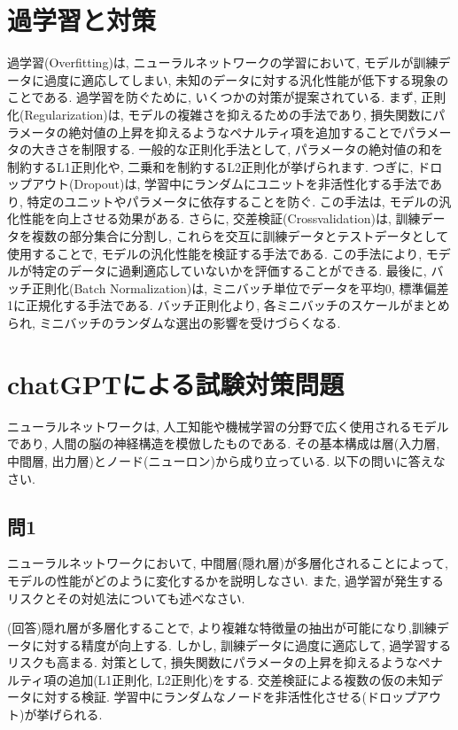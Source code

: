 \documentclass[dvipdfmx, 10pt]{jsarticle}
\begin{document}
\section*{過学習と対策}
過学習(Overfitting)は, ニューラルネットワークの学習において, モデルが訓練データに過度に適応してしまい, 未知のデータに対する汎化性能が低下する現象のことである. 
過学習を防ぐために, いくつかの対策が提案されている. 
まず, 正則化(Regularization)は, モデルの複雑さを抑えるための手法であり, 
損失関数にパラメータの絶対値の上昇を抑えるようなペナルティ項を追加することでパラメータの大きさを制限する. 
一般的な正則化手法として, パラメータの絶対値の和を制約するL1正則化や, 二乗和を制約するL2正則化が挙げられます. 
つぎに, ドロップアウト(Dropout)は, 学習中にランダムにユニットを非活性化する手法であり, 特定のユニットやパラメータに依存することを防ぐ. 
この手法は, モデルの汎化性能を向上させる効果がある. 
さらに, 交差検証(Crossvalidation)は, 訓練データを複数の部分集合に分割し, これらを交互に訓練データとテストデータとして使用することで, 
モデルの汎化性能を検証する手法である. この手法により, モデルが特定のデータに過剰適応していないかを評価することができる. 
最後に, バッチ正則化(Batch Normalization)は, ミニバッチ単位でデータを平均0, 標準偏差1に正規化する手法である. 
バッチ正則化より, 各ミニバッチのスケールがまとめられ, ミニバッチのランダムな選出の影響を受けづらくなる. 

\section*{chatGPTによる試験対策問題}

ニューラルネットワークは, 人工知能や機械学習の分野で広く使用されるモデルであり, 人間の脳の神経構造を模倣したものである. その基本構成は層(入力層, 中間層, 出力層)とノード(ニューロン)から成り立っている. 以下の問いに答えなさい. 

\subsection*{問1}
ニューラルネットワークにおいて, 中間層(隠れ層)が多層化されることによって, モデルの性能がどのように変化するかを説明しなさい. また, 過学習が発生するリスクとその対処法についても述べなさい. 

(回答)隠れ層が多層化することで, より複雑な特徴量の抽出が可能になり,訓練データに対する精度が向上する. 
しかし, 訓練データに過度に適応して, 過学習するリスクも高まる. 
対策として, 損失関数にパラメータの上昇を抑えるようなペナルティ項の追加(L1正則化, L2正則化)をする. 
交差検証による複数の仮の未知データに対する検証. 学習中にランダムなノードを非活性化させる(ドロップアウト)が挙げられる. 
\end{document}
